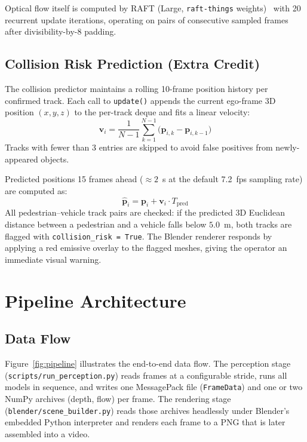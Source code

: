 \documentclass[conference]{IEEEtran}
\begin{document}
Optical flow itself is computed by RAFT (Large, \texttt{raft-things}
weights)~\cite{teed2020raft} with 20 recurrent update iterations, operating
on pairs of consecutive sampled frames after divisibility-by-8 padding.

\subsection{Collision Risk Prediction (Extra Credit)}

The collision predictor maintains a rolling 10-frame position history per
confirmed track.  Each call to \texttt{update()} appends the current
ego-frame 3D position $(x, y, z)$ to the per-track deque and fits a linear
velocity:
\begin{equation}
  \mathbf{v}_i = \frac{1}{N-1}\sum_{k=1}^{N-1}
    \bigl(\mathbf{p}_{i,k} - \mathbf{p}_{i,k-1}\bigr)
\end{equation}
Tracks with fewer than 3 entries are skipped to avoid false positives
from newly-appeared objects.

Predicted positions 15 frames ahead ($\approx 2$~s at the default
7.2~fps sampling rate) are computed as:
\begin{equation}
  \hat{\mathbf{p}}_i = \mathbf{p}_i + \mathbf{v}_i \cdot T_{\text{pred}}
\end{equation}
All pedestrian--vehicle track pairs are checked: if the predicted
3D Euclidean distance between a pedestrian and a vehicle falls below
$5.0$~m, both tracks are flagged with \texttt{collision\_risk = True}.
The Blender renderer responds by applying a red emissive overlay to the
flagged meshes, giving the operator an immediate visual warning.

\section{Pipeline Architecture}

\subsection{Data Flow}

Figure~\ref{fig:pipeline} illustrates the end-to-end data flow.  The
perception stage (\texttt{scripts/run\_perception.py}) reads frames at a
configurable stride, runs all models in sequence, and writes one
MessagePack file (\texttt{FrameData}) and one or two NumPy archives (depth,
flow) per frame.  The rendering stage (\texttt{blender/scene\_builder.py})
reads those archives headlessly under Blender's embedded Python interpreter
and renders each frame to a PNG that is later assembled into a video.
\end{document}
